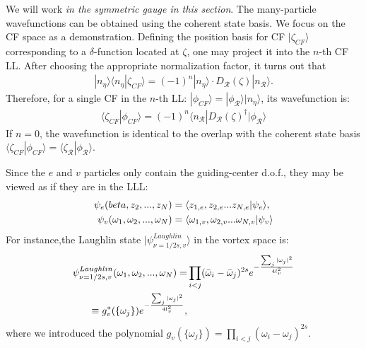 We will work \emph{in the symmetric gauge in this section}. The many-particle wavefunctions can be obtained using the coherent state basis. We focus on the CF space as a demonstration. 
Defining the position basis for CF $|\zeta_{CF}\rangle$ corresponding to a $\delta$-function located at $\zeta$, one may project it into the $n$-th CF LL. After choosing the appropriate normalization factor, it turns out that
\begin{align}
|n_{\eta}\rangle\langle n_{\eta}|\zeta_{CF}\rangle=(-1)^n |n_{\eta}\rangle \cdot D_{\mathcal R}(\zeta)|n_{\mathcal R}\rangle.
\end{align}
Therefore, for a single CF in the $n$-th LL: $|\phi_{CF}\rangle=|\phi_{\mathcal R}\rangle|n_{\eta}\rangle$, its wavefunction is:
\begin{align}
\langle \zeta_{CF} |\phi_{CF}\rangle=(-1)^n \langle n_{\mathcal R}|D_{\mathcal R}(\zeta)^\dagger|\phi_{\mathcal R}\rangle
\end{align}
If $n=0$, the wavefunction is identical to the overlap with the coherent state basis $\langle \zeta_{CF} |\phi_{CF}\rangle=\langle \zeta_{\mathcal R}|\phi_{\mathcal R}\rangle$.

Since the $e$ and $v$ particles only contain the guiding-center d.o.f., they may be viewed as if they are in the LLL:
\begin{align}
\psi_e(beta,z_2,...,z_N)&=\langle z_{1,e},z_{2,e}... z_{N,e}|\psi_e\rangle,\notag\\
\psi_v(\omega_1,\omega_2,...,\omega_N)&=\langle \omega_{1,v},\omega_{2,v}... \omega_{N,v}|\psi_v\rangle
\end{align}
For instance,the Laughlin state $|\psi^{Laughlin}_{\nu=1/2s,v}\rangle$ in the vortex space is:
\begin{align}
\psi^{Laughlin}_{\nu=1/2s,v}(\omega_1,\omega_2,...,\omega_N)=& \prod_{i<j} (\bar\omega_i-\bar\omega_j)^{2s}  e^{-\frac{\sum_j|\omega_j|^2}{4l_v^2}}\notag\\
\equiv g_v^*(\{\omega_j\}) e^{-\frac{\sum_j|\omega_j|^2}{4l_v^2}},
\end{align}
where we introduced the polynomial $g_v(\{\omega_j\})=\prod_{i<j} (\omega_i-\omega_j)^{2s}$.

